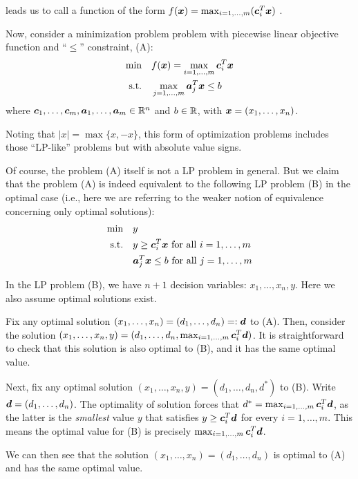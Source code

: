 \begin{enumerate}
 leads us to call a function of the form
\(f(\bm{x})=\max_{i=1,\dotsc,m}(\bm{c}_i^{T}\bm{x})\) .

Now, consider a minimization problem problem with piecewise linear
objective function and ``\(\leq\)'' constraint, (A):
\begin{align*}
\text{min}\quad&f(\bm{x})=\max_{i=1,\dotsc,m}\bm{c}_i^{T}\bm{x} \\
\text{s.t.}\quad&\max_{j=1,\dotsc,m}\bm{a}_j^{T}\bm{x}\le b
\end{align*}
where \(\bm{c}_1,\dotsc,\bm{c}_m,\bm{a}_1,\dotsc,\bm{a}_m\in\mathbb{R}^n\) and
\(b\in\mathbb{R}\), with \(\bm{x}=(x_1,\dotsc,x_n)\).
\begin{note}
Noting that \(|x|=\max\{x,-x\}\), this form of optimization problems includes
those ``LP-like'' problems but with absolute value signs.
\end{note}
Of course, the problem (A) itself is not a LP problem in general.  But we claim
that the problem (A) is indeed equivalent to the following LP problem (B) in
the optimal case (i.e., here we are referring to the weaker notion of
equivalence concerning only optimal solutions):
\begin{align*}
\text{min}\quad&y \\
\text{s.t.}\quad&y\ge \bm{c}_i^{T}\bm{x}\text{ for all \(i=1,\dotsc,m\)} \\
\quad&\bm{a}_j^{T}\bm{x}\le b\text{ for all \(j=1,\dotsc,m\)}
\end{align*}
\begin{note}
In the LP problem (B), we have \(n+1\) decision variables:
\(x_1,\dotsc,x_n,y\). Here we also assume optimal solutions exist.
\end{note}

\begin{pf}
Fix any optimal solution \((x_1,\dotsc,x_n)=(d_1,\dotsc,d_n)=:\bm{d}\) to
(A). Then, consider the solution
\((x_1,\dotsc,x_n,y)=(d_1,\dotsc,d_n,\max_{i=1,\dotsc,m}\bm{c}_i^{T}\bm{d})\).
It is straightforward to check that this solution is also optimal to (B), and
it has the same optimal value.

Next, fix any optimal solution \((x_1,\dotsc,x_n,y)=(d_1,\dotsc,d_n,d^*)\) to
(B).  Write \(\bm{d}=(d_1,\dotsc,d_n)\). The optimality of solution forces
that \(d^*=\max_{i=1,\dotsc,m}\bm{c}_i^{T}\bm{d}\), as the latter is the
\emph{smallest} value \(y\) that satisfies \(y\ge\bm{c}_i^{T}\bm{d}\) for
every \(i=1,\dotsc,m\). This means the optimal value for (B) is precisely
\(\max_{i=1,\dotsc,m}\bm{c}_i^{T}\bm{d}\).


We can then see that the solution \((x_1,\dotsc,x_n)=(d_1,\dotsc,d_n)\) is
optimal to (A) and has the same optimal value.
\end{pf}
\end{enumerate}

